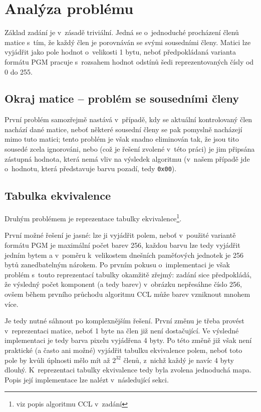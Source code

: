 \section{Analýza problému}

Základ zadání je v~zásadě triviální. Jedná se o~jednoduché procházení členů matice s~tím, že každý člen je porovnáván
se svými sousedními členy. Matici lze vyjádřit jako pole hodnot o~velikosti 1 bytu, neboť předpokládaná varianta formátu
PGM pracuje s~rozsahem hodnot odstínů šedi reprezentovaných čísly od 0 do 255.

\subsection[Okraj matice]{Okraj matice -- problém se sousedními členy}
První problém samozřejmě nastává v~případě, kdy se aktuální kontrolovaný člen nachází
 dané matice, neboť některé sousední členy se pak pomyslně nacházejí mimo tuto matici; tento problém je
však snadno eliminován tak, že jsou tito sousedé zcela ignorováni, nebo (což je řešení zvolené v~této práci) je jim
připsána zástupná hodnota, která nemá vliv na výsledek algoritmu (v~našem případě jde o~hodnotu, která představuje barvu
pozadí, tedy \verb|0x00|).

\subsection{Tabulka ekvivalence}
Druhým problémem je reprezentace tabulky ekvivalence\footnote{viz popis algoritmu CCL v~zadání}.

První možné řešení je jasné: lze ji vyjádřit polem, neboť v~použité variantě formátu PGM je maximální počet barev 256,
každou barvu lze tedy vyjádřit jedním bytem a v~poměru k~velikostem dnešních paměťových jednotek je 256 bytů
zanedbatelným nárokem. Po prvním pokusu o~implementaci je však problém s~touto reprezentací tabulky okamžitě zřejmý:
zadání sice předpokládá, že výsledný počet komponent (a tedy barev) v~obrázku nepřesáhne číslo 256, ovšem během prvního
průchodu algoritmu CCL může barev vzniknout mnohem více.

Je tedy nutné sáhnout po komplexnějším řešení. První změnu je třeba provést v~reprezentaci matice, neboť 1 byte
na člen již není dostačující. Ve výsledné implementaci je tedy barva pixelu vyjádřena 4 byty. Po této změně již však
není praktické (a často ani možné) vyjádřit tabulku ekvivalence polem, neboť toto pole by kvůli úplnosti mělo mít až
$ 2^{32} $ členů, z~nichž každý je navíc 4 byty dlouhý. K~reprezentaci tabulky ekvivalence tedy byla zvolena jednoduchá
mapa. Popis její implementace lze nalézt v~následující sekci.
